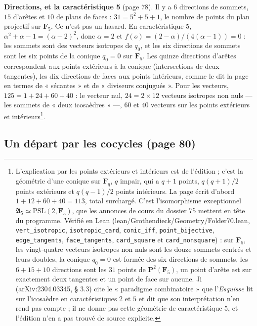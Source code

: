 \documentclass[11pt,a4paper]{article}
\begin{document}
\textbf{Directions, et la caractéristique 5} (page 78). Il y a $6$ directions
de sommets, $15$ d'arêtes et $10$ de plans de faces : $31 = 5^2 + 5 + 1$, le
nombre de points du plan projectif sur $\mathbf{F}_5$. Ce n'est pas un hasard.
En caractéristique $5$, $\alpha^2 + \alpha - 1 = (\alpha - 2)^2$, donc $\alpha =
2$ et $f(o) = (2 - \alpha)/(4(\alpha - 1)) = 0$ : les sommets sont des vecteurs
isotropes de $q_0$, et les six directions de sommets sont les six points de la
conique $q_0 = 0$ sur $\mathbf{F}_5$. Les quinze directions d'arêtes
correspondent aux points extérieurs à la conique (intersections de deux
tangentes), les dix directions de faces aux points intérieurs, comme le dit la
page en termes de « sécantes » et de « diviseurs conjugués ». Pour les
vecteurs, $125 = 1 + 24 + 60 + 40$ : le vecteur nul, $24 = 2 \times 12$
vecteurs isotropes non nuls --- les sommets de « deux icosaèdres » ---, $60$
et $40$ vecteurs sur les points extérieurs et intérieurs\footnote{L'explication
par les points extérieurs et intérieurs est de l'édition ; c'est la géométrie
d'une conique sur $\mathbf{F}_q$, $q$ impair, qui a $q + 1$ points,
$q(q+1)/2$ points extérieurs et $q(q-1)/2$ points intérieurs. La page écrit
d'abord $1 + 12 + 60 + 40 = 113$, total surchargé. C'est l'isomorphisme
exceptionnel $\mathfrak{A}_5 \simeq \mathrm{PSL}(2, \mathbf{F}_5)$, que les
annonces de cours du dossier 75 mettent en tête du programme. Vérifié en Lean
(lean/Grothendieck/Geometry/Folder70.lean, \texttt{vert\_isotropic},
\texttt{isotropic\_card}, \texttt{conic\_iff}, \texttt{point\_bijective},
\texttt{edge\_tangents}, \texttt{face\_tangents}, \texttt{card\_square} et
\texttt{card\_nonsquare}) : sur $\mathbf{F}_5$, les vingt-quatre vecteurs
isotropes non nuls sont les douze sommets centrés et leurs doubles, la conique
$q_0 = 0$ est formée des six directions de sommets, les $6 + 15 + 10$
directions sont les $31$ points de $\mathbf{P}^2(\mathbf{F}_5)$, un point
d'arête est sur exactement deux tangentes et un point de face sur aucune. Ji
(arXiv:2304.03345, § 3.3) cite le « paradigme combinatoire » que
l'\emph{Esquisse} lit sur l'icosaèdre en caractéristiques $2$ et $5$ et dit
que son interprétation n'en rend pas compte ; il ne donne pas cette géométrie
de caractéristique $5$, et l'édition n'en a pas trouvé de source explicite.}.

\subsection*{Un départ par les cocycles (page 80)}
\end{document}
